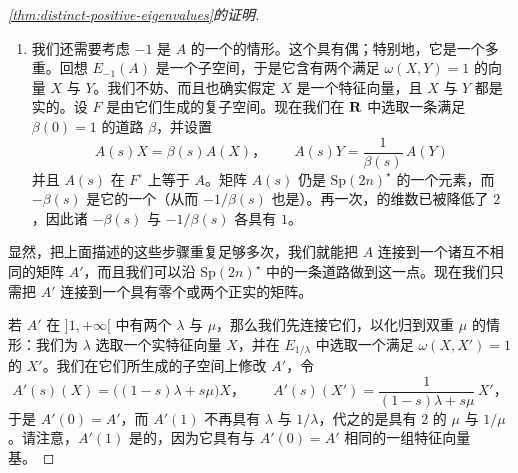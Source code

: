 \begin{proof}[\cref{thm:distinct-positive-eigenvalues}的证明]
\begin{enumerate}[label=(\arabic*)]
\item 我们还需要考虑 $-1$ 是 $A$ 的一个\trEigenvalue{}的情形。这个\trEigenvalue{}具有偶\trMultiplicity；特别地，它是一个多重\trEigenvalue。回想 $E_{-1}(A)$ 是一个\trSymplectic{}子空间，于是它含有两个满足 $\omega(X,Y)=1$ 的向量 $X$ 与 $Y$。我们不妨、而且也确实假定 $X$ 是一个特征向量，且 $X$ 与 $Y$ 都是实的。设 $F$ 是由它们生成的复子空间。现在我们在 $\mathbf{R}$ 中选取一条满足 $\beta(0)=1$ 的道路 $\beta$，并设置
\[
A(s)X=\beta(s)A(X)\text{，}\qquad
A(s)Y=\frac{1}{\beta(s)}\,A(Y)
\]
并且 $A(s)$ 在 $F^\circ$ 上等于 $A$。矩阵 $A(s)$ 仍是 $\mathrm{Sp}(2n)^\star$ 的一个元素，而 $-\beta(s)$ 是它的一个\trEigenvalue（从而 $-1/\beta(s)$ 也是）。再一次，\trGeneralizedEigenspace{}的维数已被降低了 $2$，因此诸\trEigenvalue{} $-\beta(s)$ 与 $-1/\beta(s)$ 各具有\trMultiplicity{} $1$。
\end{enumerate}

显然，把上面描述的这些步骤重复足够多次，我们就能把 $A$ 连接到一个诸\trEigenvalue{}互不相同的矩阵 $A'$，而且我们可以沿 $\mathrm{Sp}(2n)^\star$ 中的一条道路做到这一点。现在我们只需把 $A'$ 连接到一个具有零个或两个正实\trEigenvalue{}的矩阵。

若 $A'$ 在 $]1,+\infty[$ 中有两个\trEigenvalue{} $\lambda$ 与 $\mu$，那么我们先连接它们，以化归到双重\trEigenvalue{} $\mu$ 的情形：我们为 $\lambda$ 选取一个实特征向量 $X$，并在 $E_{1/\lambda}$ 中选取一个满足 $\omega(X,X')=1$ 的 $X'$。我们在它们所生成的子空间上修改 $A'$，令
\[
A'(s)(X)=\bigl((1-s)\lambda+s\mu\bigr)X\text{，}\qquad
A'(s)(X')=\frac{1}{(1-s)\lambda+s\mu}\,X'\text{，}
\]
于是 $A'(0)=A'$，而 $A'(1)$ 不再具有\trEigenvalue{} $\lambda$ 与 $1/\lambda$，代之的是具有\trMultiplicity{} $2$ 的 $\mu$ 与 $1/\mu$。请注意，$A'(1)$ 是\trDiagonalizable{}的，因为它具有与 $A'(0)=A'$ 相同的一组特征向量基。


\end{proof}
